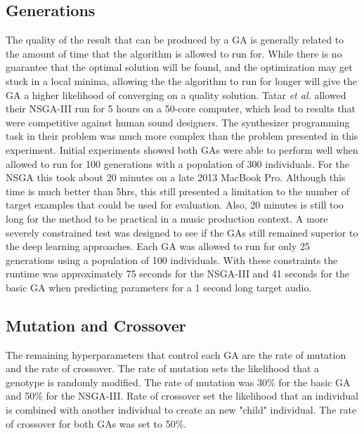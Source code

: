  \subsection{Generations}
 The quality of the result that can be produced by a GA is generally related to the amount of time that the algorithm is allowed to run for. While there is no guarantee that the optimal solution will be found, and the optimization may get stuck in a local minima, allowing the the algorithm to run for longer will give the GA a higher likelihood of converging on a quality solution. Tatar \textit{et al.} allowed their NSGA-III run for 5 hours on a 50-core computer, which lead to results that were competitive against human sound designers. The synthesizer programming task in their problem was much more complex than the problem presented in this experiment. Initial experiments showed both GAs were able to perform well when allowed to run for 100 generations with a population of 300 individuals. For the NSGA this took about 20 minutes on a late 2013 MacBook Pro. Although this time is much better than 5hrs, this still presented a limitation to the number of target examples that could be used for evaluation. Also, 20 minutes is still too long for the method to be practical in a music production context. A more severely constrained test was designed to see if the GAs still remained superior to the deep learning approaches. Each GA was allowed to run for only 25 generations using a population of 100 individuals. With these constraints the runtime was approximately 75 seconds for the NSGA-III and 41 seconds for the basic GA when predicting parameters for a 1 second long target audio.
 
 \subsection{Mutation and Crossover}
 The remaining hyperparameters that control each GA are the rate of mutation and the rate of crossover. The rate of mutation sets the likelihood that a genotype is randomly modified. The rate of mutation was 30\% for the basic GA and 50\% for the NSGA-III. Rate of crossover set the likelihood that an individual is combined with another individual to create an new "child" individual. The rate of crossover for both GAs was set to 50\%.



